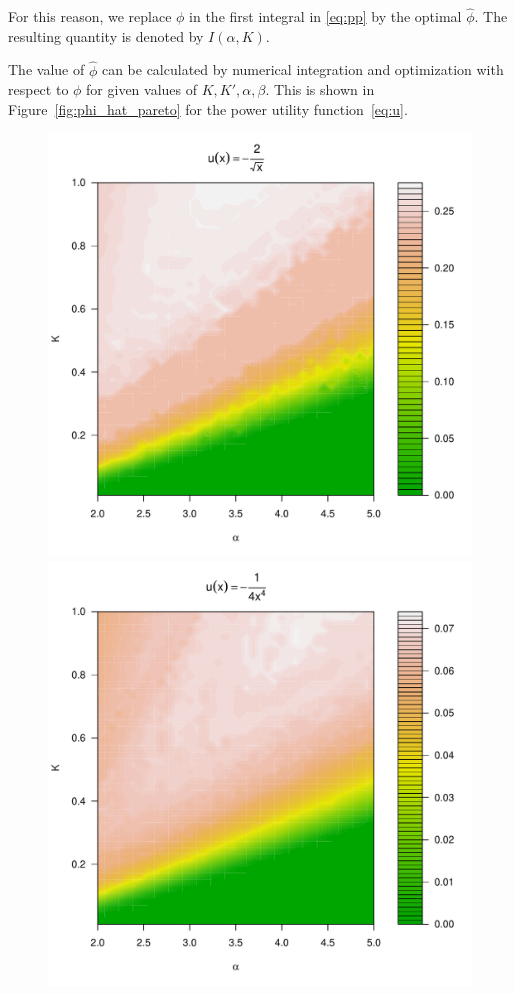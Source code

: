\documentclass[11pt,a4]{amsart}
\newcommand{\fct}{function}
\newcommand{\1}{{\mathbf 1}}
\begin{document}
For this reason, we replace $\phi$ in the first integral in \eqref{eq:pp} by the optimal $\hat\phi$. The resulting
quantity is denoted by $I(\alpha, K)$.
\par
The value of $\hat\phi$ can be calculated
by numerical integration and optimization with respect to $\phi$ for given values of $K, K', \alpha, \beta$. 
This is shown in 
Figure~\ref{fig:phi_hat_pareto} for the power utility \fct\ \eqref{eq:u}.
\begin{figure}[htb!]
  \begin{minipage}{0.5\linewidth}
    \includegraphics[width=\textwidth]{phi_hat_pareto5e-1.pdf}    
  \end{minipage}\hfill
  \begin{minipage}{0.5\linewidth}
    \includegraphics[width=\textwidth]{phi_hat_pareto4.pdf}

\end{minipage}
\end{figure}
\end{document}
